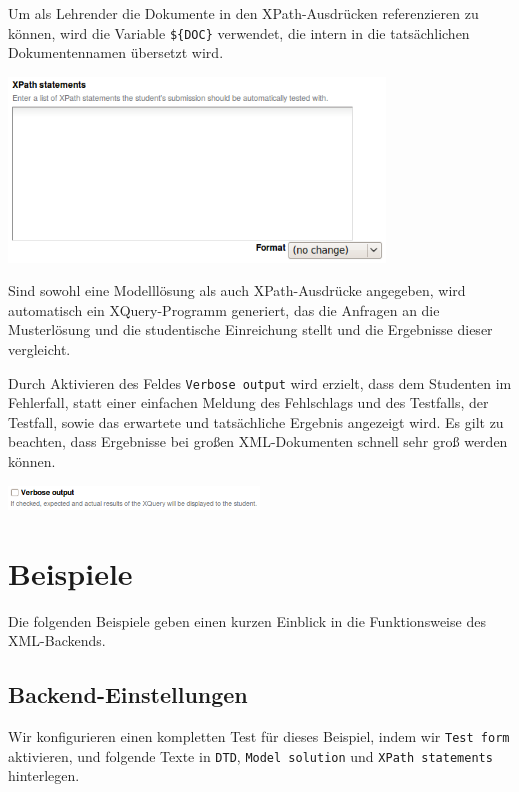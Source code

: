 \documentclass[a4paper]{scrartcl}
\newcommand{\anf}[1]{\glqq{}#1\grqq{}}
\begin{document}
      Um als Lehrender die Dokumente in den XPath-Ausdrücken referenzieren zu können, wird die Variable \anf{\texttt{\$\{DOC\}}} verwendet, die intern in die tatsächlichen Dokumentennamen übersetzt wird.

      \begin{center}
        \captionsetup{type=figure}
	      \includegraphics[width=0.75\textwidth]{images/XPath.png}
	      \label{fig:xpath}
      \end{center}
      Sind sowohl eine Modelllösung als auch XPath-Ausdrücke angegeben, wird automatisch ein XQuery-Programm generiert, das die Anfragen an die Musterlösung und die studentische Einreichung stellt und die Ergebnisse dieser vergleicht.
      
      Durch Aktivieren des Feldes \anf{\texttt{Verbose output}} wird erzielt, dass dem Studenten im Fehlerfall, statt einer einfachen Meldung des Fehlschlags und des Testfalls, der Testfall, sowie das erwartete und tatsächliche Ergebnis angezeigt wird. Es gilt zu beachten, dass Ergebnisse bei großen XML-Dokumenten schnell sehr groß werden können.
      
      \begin{center}
        \captionsetup{type=figure}
	      \includegraphics[width=0.50\textwidth]{images/verbose.png}
	      \label{fig:verbose}
      \end{center}
  	  
	\section{Beispiele}
	  Die folgenden Beispiele geben einen kurzen Einblick in die Funktionsweise des XML-Backends.
	  \subsection{Backend-Einstellungen}
	  Wir konfigurieren einen kompletten Test für dieses Beispiel, indem wir \anf{\texttt{Test form}} aktivieren, und folgende Texte in \anf{\texttt{DTD}}, \anf{\texttt{Model solution}} und \anf{\texttt{XPath statements}} hinterlegen.
	  
\end{document}
